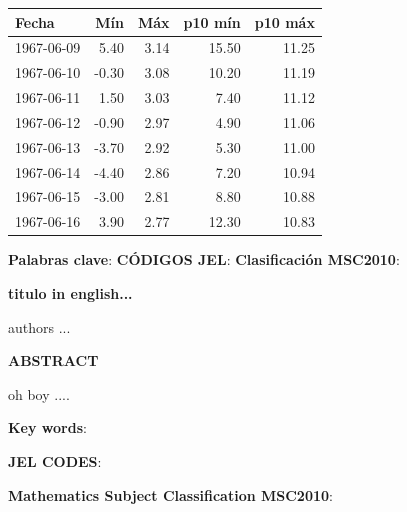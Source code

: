 \documentclass[12pt]{article}\usepackage[]{graphicx}\usepackage[]{color}
\begin{document}
\begin{scriptsize}
\begin{center}
\begin{tabular}{lrrrr}
  \hline
Fecha & Mín & Máx & p10 mín & p10 máx \\ 
  \hline
1967-06-09 & 5.40 & 3.14 & 15.50 & 11.25 \\ 
  1967-06-10 & -0.30 & 3.08 & 10.20 & 11.19 \\ 
  1967-06-11 & 1.50 & 3.03 & 7.40 & 11.12 \\ 
  1967-06-12 & -0.90 & 2.97 & 4.90 & 11.06 \\ 
  1967-06-13 & -3.70 & 2.92 & 5.30 & 11.00 \\ 
  1967-06-14 & -4.40 & 2.86 & 7.20 & 10.94 \\ 
  1967-06-15 & -3.00 & 2.81 & 8.80 & 10.88 \\ 
  1967-06-16 & 3.90 & 2.77 & 12.30 & 10.83 \\ 
   \hline
\end{tabular}
\end{center}
\end{scriptsize}


\textbf{Palabras clave}:  
\textbf{C\'ODIGOS JEL}: 
\vspace{0.5cm}
\textbf{Clasificaci\'on MSC2010}: 

\begin{center}
	\textbf{titulo in english...}
\end{center}

\begin{center}
authors ... 
\end{center}

\begin{center}
	\textbf{ABSTRACT}
\end{center}

oh boy .... 

\textbf{Key words}:  

\textbf{JEL CODES}: 

\textbf{Mathematics Subject Classification MSC2010}: 

\pagebreak
\pagestyle{fancy}
\fancyhf{}
\fancyhead[LE,RO]{\thepage}


\renewcommand{\refname}{Referencias Bibliográficas}
\end{document}
